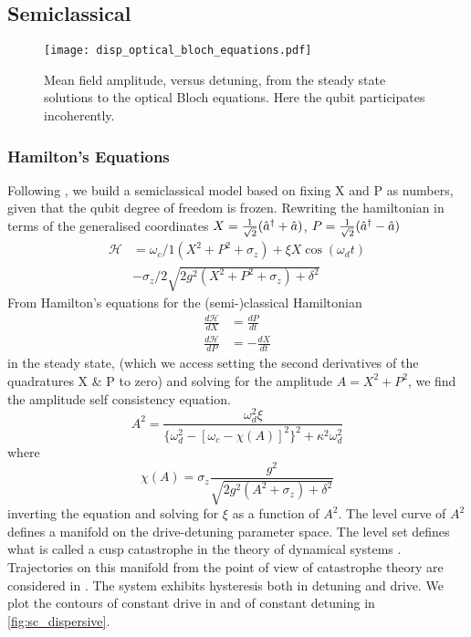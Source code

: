 \subsection{Semiclassical}
\begin{figure}[!hb]
  \hspace*{-1cm}
  \texttt{[image: disp\_optical\_bloch\_equations.pdf]}
  \caption{Mean field amplitude, versus detuning, from the steady state solutions to the optical Bloch equations. Here the qubit participates incoherently.} 
  \label{fig:sc_dispersive_ob}
\end{figure}

\subsubsection{Hamilton's Equations}
Following \cite{Bishop2010}, we build a semiclassical model based on fixing X and P as numbers, given that the qubit degree of freedom is frozen.
Rewriting the hamiltonian in terms of the generalised coordinates $X = \frac{1}{\sqrt{2}}({\hat{a}^\dagger} + \hat{a})$, $P = \frac{1}{\sqrt{2}}({\hat{a}^\dagger}-\hat{a})$
\begin{align}
        \mathscr{H} &= \omega_c/1 (X^2 + P^2 + \sigma_z) + \xi X \cos(\omega_d t)\nonumber\\
                    & - \sigma_z /2 \sqrt{2g^2(X^2+P^2+\sigma_z) + \delta^2}
\end{align}
From Hamilton's equations for the (semi-)classical Hamiltonian
\begin{align}
        \frac{d\mathscr{H}}{dX} &= \frac{dP}{dt}\\
        \frac{d\mathscr{H}}{dP} &= -\frac{dX}{dt}
\end{align}
in the steady state, (which we access setting the second derivatives of the quadratures X \& P to zero) and solving for the amplitude $A = X^2 + P^2$, we find the amplitude self consistency equation.
\begin{equation}
        A^2 = \frac{\omega_d^2\xi}{\{\omega_d^2 - [\omega_c - \chi (A) ]^2 \}^2+ \kappa^2 \omega_d^2}
\end{equation}
where
\begin{equation}
        \chi(A) = \sigma_z \frac{g^2}{\sqrt{2g^2(A^2 + \sigma_z) + \delta^2}}
        \label{eq:sc_dispersive}
\end{equation}
inverting the equation and solving for $\xi$ as a function of $A^2$. 
The level curve of $A^2$ defines a manifold on the drive-detuning parameter space. 
The level set defines what is called a cusp catastrophe in the theory of dynamical systems \cite{Stewart1982}.
Trajectories on this manifold from the point of view of catastrophe theory are considered in \cite{Agrawal1979} .  
The system exhibits hysteresis both in detuning and drive. 
We plot the contours of constant drive in and of constant detuning in \cref{fig:sc_dispersive}.
